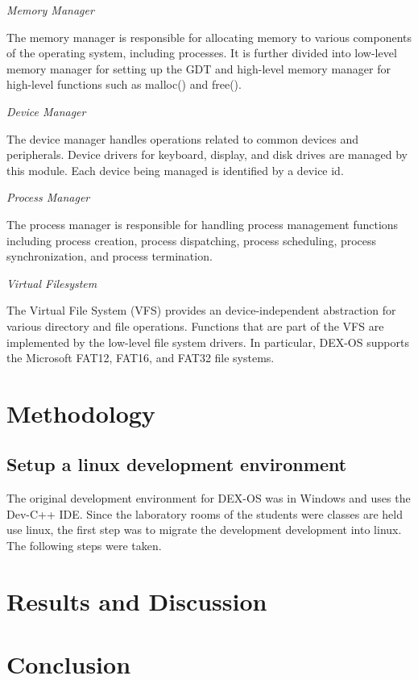 \documentclass{acm_proc_article-sp}
\begin{document}
\textit{Memory Manager}

The memory manager is responsible for allocating memory to various components
of the operating system, including processes. It is further divided into 
low-level memory manager for setting up the GDT and high-level memory manager
for high-level functions such as malloc() and free().

\textit{Device Manager}

The device manager handles operations related to common devices and peripherals.
Device drivers for keyboard, display, and disk drives are managed by this 
module. Each device being managed is identified by a device id. 

\textit{Process Manager}

The process manager is responsible for handling process management functions
including process creation, process dispatching, process scheduling, process
synchronization, and process termination. 

\textit{Virtual Filesystem}

The Virtual File System (VFS) provides an device-independent abstraction for
various directory and file operations. Functions that are part of the VFS are
implemented by the low-level file system drivers. In particular, DEX-OS 
supports the Microsoft FAT12, FAT16, and FAT32 file systems.

\section{Methodology}

\subsection{Setup a linux development environment}
The original development environment for DEX-OS was in Windows and uses the 
Dev-C++ IDE. Since the laboratory rooms of the students were classes are held
use linux, the first step was to migrate the development development into 
linux. The following steps were taken.

\section{Results and Discussion}

\section{Conclusion}



\balancecolumns
\end{document}
